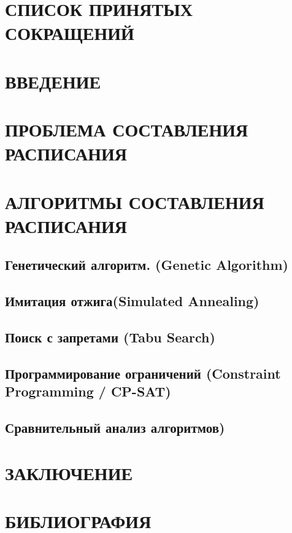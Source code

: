 \documentclass[a4paper,14pt]{extreport}
\begin{document}
\maketitlepage
\tableofcontents

\clearpage
\section*{СПИСОК ПРИНЯТЫХ СОКРАЩЕНИЙ}


\clearpage
\section*{ВВЕДЕНИЕ}


\clearpage
\section{ПРОБЛЕМА СОСТАВЛЕНИЯ РАСПИСАНИЯ}


\clearpage
\section{АЛГОРИТМЫ СОСТАВЛЕНИЯ РАСПИСАНИЯ}
\subsection{Генетический алгоритм. (Genetic Algorithm)}

\subsection{Имитация отжига(Simulated Annealing)}

\subsection{Поиск с запретами (Tabu Search)}

\subsection{Программирование ограничений (Constraint Programming / CP-SAT)}

\subsection{Сравнительный анализ алгоритмов)}


\clearpage
\section*{ЗАКЛЮЧЕНИЕ}


\clearpage
{}
\renewcommand{\bibname}{БИБЛИОГРАФИЯ}
\section*{БИБЛИОГРАФИЯ}

\end{document}
